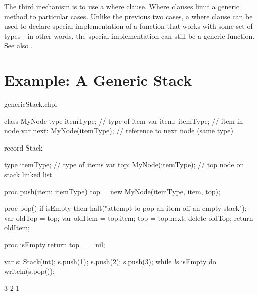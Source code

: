 The third mechanism is to use a where clause. Where clauses limit a
generic method to particular cases. Unlike the previous two cases, a
where clause can be used to declare special implementation of a function
that works with some set of types - in other words, the special
implementation can still be a generic function.  See also
.

\section{Example: A Generic Stack}
\label{Example_Generic_Stack}
\begin{chapelexample}{genericStack.chpl}
\begin{chapel}
class MyNode {
  type itemType;              // type of item
  var item: itemType;         // item in node
  var next: MyNode(itemType); // reference to next node (same type)
}

record Stack {
  type itemType;             // type of items
  var top: MyNode(itemType); // top node on stack linked list

  proc push(item: itemType) {
    top = new MyNode(itemType, item, top);
  }

  proc pop() {
    if isEmpty then
      halt("attempt to pop an item off an empty stack");
    var oldTop = top;
    var oldItem = top.item;
    top = top.next;
    delete oldTop;
    return oldItem;
  }

  proc isEmpty return top == nil;
}
\end{chapel}
\begin{chapelpost}
var s: Stack(int);
s.push(1);
s.push(2);
s.push(3);
while !s.isEmpty do
  writeln(s.pop());
\end{chapelpost}
\begin{chapeloutput}
3
2
1
\end{chapeloutput}
\end{chapelexample}
